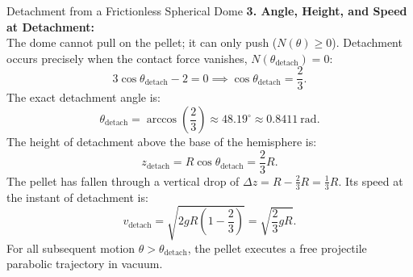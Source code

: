 \begin{workedexample}{Detachment from a Frictionless Spherical Dome}
\textbf{3. Angle, Height, and Speed at Detachment:}\\
The dome cannot pull on the pellet; it can only push ($N(\theta) \ge 0$). Detachment occurs precisely when the contact force vanishes, $N(\theta_{\text{detach}}) = 0$:
\[
3\cos\theta_{\text{detach}} - 2 = 0 \implies \cos\theta_{\text{detach}} = \frac{2}{3}.
\]
The exact detachment angle is:
\[
\theta_{\text{detach}} = \arccos\left(\frac{2}{3}\right) \approx 48.19^\circ \approx 0.8411\ \mathrm{rad}.
\]
The height of detachment above the base of the hemisphere is:
\[
z_{\text{detach}} = R\cos\theta_{\text{detach}} = \frac{2}{3}R.
\]
The pellet has fallen through a vertical drop of $\Delta z = R - \frac{2}{3}R = \frac{1}{3}R$.
Its speed at the instant of detachment is:
\[
v_{\text{detach}} = \sqrt{2gR\left(1 - \frac{2}{3}\right)} = \sqrt{\frac{2}{3}gR}.
\]
For all subsequent motion $\theta > \theta_{\text{detach}}$, the pellet executes a free projectile parabolic trajectory in vacuum.
\end{workedexample}

